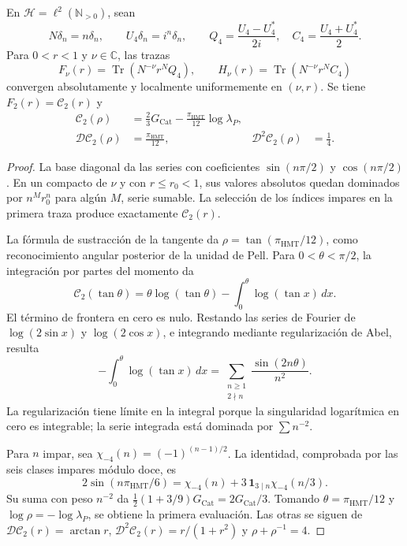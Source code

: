 \begin{proposition}
\label{corpus9:iv:pell-evaluacion}
En \(\mathcal H=\ell^2(\mathbb N_{>0})\), sean
\[
 N\delta_n=n\delta_n,\qquad U_4\delta_n=i^n\delta_n,\qquad
 Q_4=\frac{U_4-U_4^*}{2i},\quad
 C_4=\frac{U_4+U_4^*}{2}.
\]
Para \(0<r<1\) y \(\nu\in\mathbb C\), las trazas
\[
 F_\nu(r)=\operatorname{Tr}(N^{-\nu}r^NQ_4),\qquad
 H_\nu(r)=\operatorname{Tr}(N^{-\nu}r^NC_4)
\]
convergen absolutamente y localmente uniformemente en
\((\nu,r)\). Se tiene \(F_2(r)=\mathcal C_2(r)\) y
\begin{align}
 \mathcal C_2(\rho)
   &=\frac23G_{\mathrm{Cat}}
     -\frac{\pi_{\mathrm{HMT}}}{12}\log\lambda_P,\\
 \mathcal D\mathcal C_2(\rho)&=\frac{\pi_{\mathrm{HMT}}}{12},
 &\mathcal D^2\mathcal C_2(\rho)&=\frac14 .
 \label{corpus9:iv:pell-valores}
\end{align}
\end{proposition}
\begin{proof}
La base diagonal da las series con coeficientes
\(\sin(n\pi/2)\) y \(\cos(n\pi/2)\). En un compacto de
\(\nu\) y con \(r\leq r_0<1\), sus valores absolutos quedan
dominados por \(n^M r_0^n\) para algún \(M\), serie sumable.
La selección de los índices impares en la primera traza
produce exactamente \(\mathcal C_2(r)\).

La fórmula de sustracción de la tangente da
\(\rho=\tan(\pi_{\mathrm{HMT}}/12)\), como reconocimiento
angular posterior de la unidad de Pell. Para
\(0<\theta<\pi/2\), la integración por partes del momento da
\[
 \mathcal C_2(\tan\theta)
  =\theta\log(\tan\theta)-\int_0^\theta\log(\tan x)\,dx.
\]
El término de frontera en cero es nulo. Restando las series
de Fourier de \(\log(2\sin x)\) y \(\log(2\cos x)\), e
integrando mediante regularización de Abel, resulta
\[
 -\int_0^\theta\log(\tan x)\,dx
   =\sum_{\substack{n\geq1\\2\nmid n}}
          \frac{\sin(2n\theta)}{n^2}.
\]
La regularización tiene límite en la integral porque la
singularidad logarítmica en cero es integrable; la serie
integrada está dominada por \(\sum n^{-2}\).

Para \(n\) impar, sea \(\chi_{-4}(n)=(-1)^{(n-1)/2}\).
La identidad, comprobada por las seis clases impares módulo
doce, es
\[
 2\sin(n\pi_{\mathrm{HMT}}/6)
   =\chi_{-4}(n)
     +3\,\mathbf1_{3\mid n}\chi_{-4}(n/3).
\]
Su suma con peso \(n^{-2}\) da
\(\frac12(1+3/9)G_{\mathrm{Cat}}=2G_{\mathrm{Cat}}/3\).
Tomando \(\theta=\pi_{\mathrm{HMT}}/12\) y
\(\log\rho=-\log\lambda_P\), se obtiene la primera
evaluación. Las otras se siguen de
\(\mathcal D\mathcal C_2(r)=\arctan r\),
\(\mathcal D^2\mathcal C_2(r)=r/(1+r^2)\) y
\(\rho+\rho^{-1}=4\).
\end{proof}

